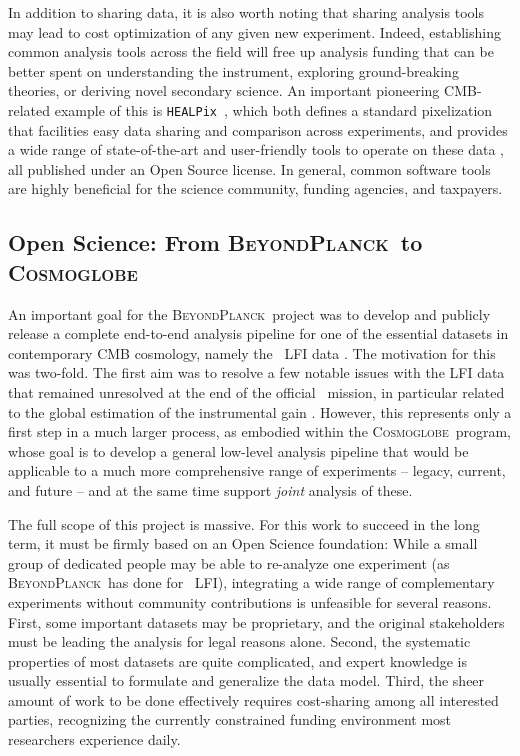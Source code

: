 \documentclass[twocolumn]{openjournal}
\def\healpix{\texttt{HEALPix}}
\newcommand{\BP}{\textsc{BeyondPlanck}}
\newcommand{\cosmoglobe}{\textsc{Cosmoglobe}}
\begin{document}
In addition to sharing data, it is also worth noting that sharing analysis
tools may lead to cost optimization of any given new experiment. Indeed,
establishing common analysis tools across the field will free up analysis
funding that can be better spent on understanding the instrument, exploring
ground-breaking theories, or deriving novel secondary science. An important
pioneering CMB-related example of this is \healpix\ \citep{gorski2005}, which
both defines a standard pixelization that facilities easy data sharing and
comparison across experiments, and provides a wide range of state-of-the-art
and user-friendly tools to operate on these data \citep[e.g.,][]{zonca2019},
all published under an Open Source license. In general, common software tools
are highly beneficial for the science community, funding agencies, and
taxpayers.

\subsection{Open Science: From \BP\ to \cosmoglobe}

An important goal for the \BP\ project was to develop and publicly release a
complete end-to-end analysis pipeline for one of the essential datasets in
contemporary CMB cosmology, namely the \Planck\ LFI data \citep{bp01}. The
motivation for this was two-fold. The first aim was to resolve a few notable
issues with the LFI data that remained unresolved at the end of the official
\Planck\ mission, in particular related to the global estimation of the
instrumental gain \citep{planck2016-l02,bp07}. However, this represents only a
first step in a much larger process, as embodied within the \cosmoglobe\
program, whose goal is to develop a general low-level analysis pipeline that
would be applicable to a much more comprehensive range of experiments --
legacy, current, and future -- and at the same time support \emph{joint}
analysis of these.

The full scope of this project is massive. For this work to succeed in the long
term, it must be firmly based on an Open Science foundation: While a small
group of dedicated people may be able to re-analyze one experiment (as \BP\ has
done for \Planck\ LFI), integrating a wide range of complementary experiments
without community contributions is unfeasible for several reasons. First, some
important datasets may be proprietary, and the original stakeholders must be
leading the analysis for legal reasons alone. Second, the systematic properties
of most datasets are quite complicated, and expert knowledge is usually
essential to formulate and generalize the data model. Third, the sheer amount
of work to be done effectively requires cost-sharing among all interested
parties, recognizing the currently constrained funding environment most
researchers experience daily.
\end{document}
